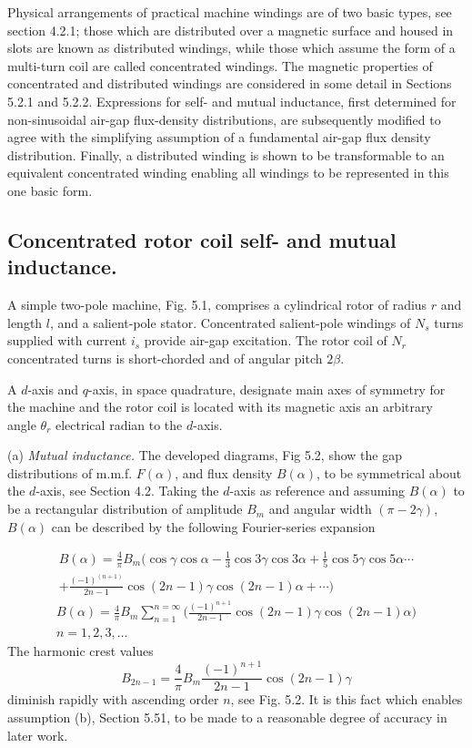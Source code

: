 \documentclass[a4paper,numbers=noenddot,12pt]{scrbook}
\begin{document}
Physical arrangements of practical machine windings are of two basic types, see section 4.2.1; those which are distributed over a magnetic surface and housed in slots are known as distributed windings, while those which assume the form of a multi-turn coil are called concentrated windings. The magnetic properties of concentrated and distributed windings are considered in some detail in Sections 5.2.1 and 5.2.2. Expressions for self- and mutual inductance, first determined for non-sinusoidal air-gap flux-density distributions, are subsequently modified to agree with the simplifying assumption of a fundamental air-gap flux density distribution. Finally, a distributed winding is shown to be transformable to an equivalent concentrated winding enabling all windings to be represented in this one basic form.

\subsection{Concentrated rotor coil self- and mutual inductance.} A simple two-pole machine, Fig. 5.1, comprises a cylindrical rotor of radius $r$ and length $l$, and a salient-pole stator. Concentrated salient-pole windings of $N_s$ turns supplied with current $i_s$ provide air-gap excitation. The rotor coil of $N_r$ concentrated turns is short-chorded and of angular pitch $2\beta$.

A $d$-axis and $q$-axis, in space quadrature, designate main axes of symmetry for the machine and the rotor coil is located with its magnetic axis an arbitrary angle $\theta_r$ electrical radian to the $d$-axis.

\noindent (a) \textit{Mutual inductance.} The developed diagrams, Fig 5.2, show the gap distributions of m.m.f. $F(\alpha)$, and flux density $B(\alpha)$, to be symmetrical about the $d$-axis, see Section 4.2. Taking the $d$-axis as reference and assuming $B(\alpha)$ to be a rectangular distribution of amplitude $B_m$ and angular width $(\pi-2\gamma)$, $B(\alpha)$ can be described by the following Fourier-series expansion

\begin{multline}
    B(\alpha)=\frac{4}{\pi}B_m(\cos \gamma \cos \alpha-\frac{1}{3}\cos 3\gamma \cos 3\alpha+\frac{1}{5}\cos 5\gamma \cos 5\alpha \cdots \\ + \frac{{(-1)}^{(n+1)}}{2n-1}\cos(2n-1)\gamma \cos(2n-1)\alpha+\cdots)
    \label{eq:Ecu1}
\end{multline}
\begin{multline}
    B{(\alpha)} = \frac{4}{\pi} B_m \displaystyle \sum_{n=1}^{n=\infty} \bigg( \frac{{(-1)}^{n+1}}{2n-1} \cos(2n-1)\gamma \cos(2n-1)\alpha \bigg) \\ n=1,2,3,\ldots
\end{multline}
The harmonic crest values
\begin{equation}
    B_{2n-1} = \frac{4}{\pi} B_m \frac{{(-1)}^{n+1}}{2n-1} \cos(2n-1)\gamma
\end{equation}
diminish rapidly with ascending order $n$, see Fig. 5.2. It is this fact which enables assumption (b), Section 5.51, to be made to a reasonable degree of accuracy in later work.
\end{document}
